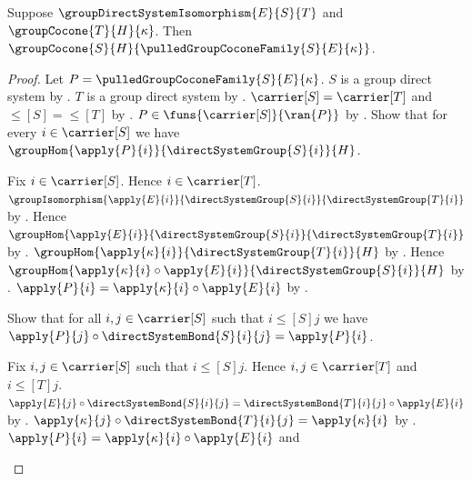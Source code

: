 \begin{theorem}\label{group_cocone_pullback_along_system_isomorphism}
    Suppose $\groupDirectSystemIsomorphism{E}{S}{T}$ and
        $\groupCocone{T}{H}{\kappa}$.
    Then $\groupCocone
        {S}{H}{\pulledGroupCoconeFamily{S}{E}{\kappa}}$.
\end{theorem}
\begin{proof}
    Let $P=\pulledGroupCoconeFamily{S}{E}{\kappa}$.
    $S$ is a group direct system by
        .
    $T$ is a group direct system by
        .
    $\carrier[S]=\carrier[T]$ and $\leq[S]=\leq[T]$ by
        .
    $P\in\funs{\carrier[S]}{\ran{P}}$ by
        .
    Show that for every $i\in\carrier[S]$ we have
        $\groupHom{\apply{P}{i}}{\directSystemGroup{S}{i}}{H}$.
    \begin{subproof}
        Fix $i\in\carrier[S]$.
        Hence $i\in\carrier[T]$.
        $\groupIsomorphism{\apply{E}{i}}
            {\directSystemGroup{S}{i}}{\directSystemGroup{T}{i}}$ by
            .
        Hence $\groupHom{\apply{E}{i}}
            {\directSystemGroup{S}{i}}{\directSystemGroup{T}{i}}$ by
            .
        $\groupHom{\apply{\kappa}{i}}
            {\directSystemGroup{T}{i}}{H}$ by
            .
        Hence $\groupHom{\apply{\kappa}{i}\circ\apply{E}{i}}
            {\directSystemGroup{S}{i}}{H}$ by
            .
        $\apply{P}{i}=\apply{\kappa}{i}\circ\apply{E}{i}$ by
            .
    \end{subproof}
    Show that for all $i,j\in\carrier[S]$ such that
        $i\mathrel{\leq[S]}j$ we have
        $\apply{P}{j}\circ\directSystemBond{S}{i}{j}
            =\apply{P}{i}$.
    \begin{subproof}
        Fix $i,j\in\carrier[S]$ such that $i\mathrel{\leq[S]}j$.
        Hence $i,j\in\carrier[T]$ and
            $i\mathrel{\leq[T]}j$.
        $\apply{E}{j}\circ\directSystemBond{S}{i}{j}
            =\directSystemBond{T}{i}{j}\circ\apply{E}{i}$ by
            .
        $\apply{\kappa}{j}\circ\directSystemBond{T}{i}{j}
            =\apply{\kappa}{i}$ by
            .
        $\apply{P}{i}=\apply{\kappa}{i}\circ\apply{E}{i}$ and

\end{subproof}
\end{proof}
